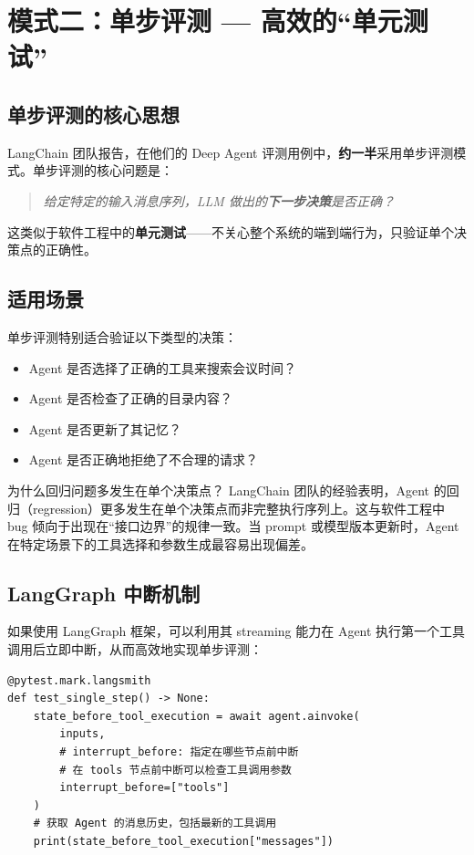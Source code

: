 \section{模式二：单步评测 --- 高效的``单元测试''}

\subsection{单步评测的核心思想}

LangChain 团队报告，在他们的 Deep Agent 评测用例中，\textbf{约一半}采用单步评测模式。单步评测的核心问题是：

\begin{quote}
\textit{给定特定的输入消息序列，LLM 做出的\textbf{下一步决策}是否正确？}
\end{quote}

这类似于软件工程中的\textbf{单元测试}——不关心整个系统的端到端行为，只验证单个决策点的正确性。

\subsection{适用场景}

单步评测特别适合验证以下类型的决策：

\begin{itemize}
  \item Agent 是否选择了正确的工具来搜索会议时间？
  \item Agent 是否检查了正确的目录内容？
  \item Agent 是否更新了其记忆？
  \item Agent 是否正确地拒绝了不合理的请求？
\end{itemize}

\begin{knowledgebox}{为什么回归问题多发生在单个决策点？}
LangChain 团队的经验表明，Agent 的回归（regression）更多发生在单个决策点而非完整执行序列上。这与软件工程中 bug 倾向于出现在``接口边界''的规律一致。当 prompt 或模型版本更新时，Agent 在特定场景下的工具选择和参数生成最容易出现偏差。
\end{knowledgebox}

\subsection{LangGraph 中断机制}

如果使用 LangGraph 框架，可以利用其 streaming 能力在 Agent 执行第一个工具调用后立即中断，从而高效地实现单步评测：

\begin{lstlisting}[caption={LangGraph 单步评测 --- interrupt\_before 机制}, label={lst:single-step}]
@pytest.mark.langsmith
def test_single_step() -> None:
    state_before_tool_execution = await agent.ainvoke(
        inputs,
        # interrupt_before: 指定在哪些节点前中断
        # 在 tools 节点前中断可以检查工具调用参数
        interrupt_before=["tools"]
    )
    # 获取 Agent 的消息历史，包括最新的工具调用
    print(state_before_tool_execution["messages"])
\end{lstlisting}

